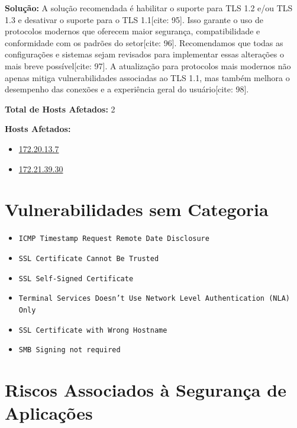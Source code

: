 \documentclass[a4paper,12pt]{article}
\begin{document}
\begin{enumerate}
\textbf{Solução:} A solução recomendada é habilitar o suporte para TLS 1.2 e/ou TLS 1.3 e desativar o suporte para o TLS 1.1[cite: 95]. Isso garante o uso de protocolos modernos que oferecem maior segurança, compatibilidade e conformidade com os padrões do setor[cite: 96]. Recomendamos que todas as configurações e sistemas sejam revisados para implementar essas alterações o mais breve possível[cite: 97]. A atualização para protocolos mais modernos não apenas mitiga vulnerabilidades associadas ao TLS 1.1, mas também melhora o desempenho das conexões e a experiência geral do usuário[cite: 98].

\textbf{Total de Hosts Afetados:} 2

\textbf{Hosts Afetados:}
\begin{itemize}
    \item \url{172.20.13.7}
    \item \url{172.21.39.30}
\end{itemize}

\end{enumerate}
\section{Vulnerabilidades sem Categoria}
\begin{itemize}
    \item \texttt{ICMP Timestamp Request Remote Date Disclosure}
    \item \texttt{SSL Certificate Cannot Be Trusted}
    \item \texttt{SSL Self-Signed Certificate}
    \item \texttt{Terminal Services Doesn't Use Network Level Authentication (NLA) Only}
    \item \texttt{SSL Certificate with Wrong Hostname}
    \item \texttt{SMB Signing not required}
\end{itemize}


\section{Riscos Associados à Segurança de Aplicações}
\end{document}

